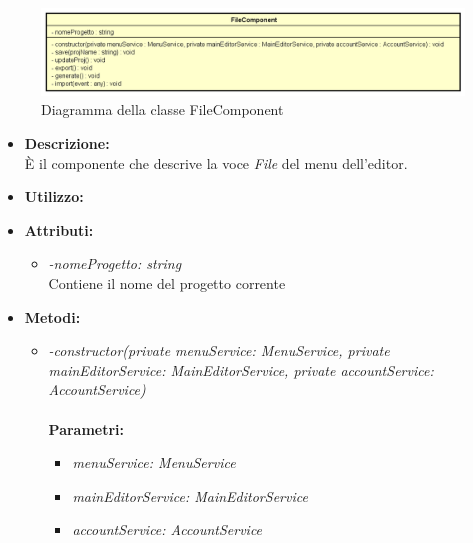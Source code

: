 \begin{figure}[h!]
	\centering
	\includegraphics[scale=0.8]{res/sections/SpecificaFrontEnd/Components/Disegnetti/file.png}
	\caption{Diagramma della classe FileComponent}
\end{figure}

\begin{itemize}
	\item \textbf{Descrizione:}\\
	È il componente che descrive la voce \textit{File} del menu dell'editor.
	\item \textbf{Utilizzo:}\\
	
	\item \textbf{Attributi:}
		\begin{itemize}
			\item \emph{-nomeProgetto: string}\\
			Contiene il nome del progetto corrente
		\end{itemize}
	\item \textbf{Metodi:}
		\begin{itemize}
			\item \emph{-constructor(private menuService: MenuService,
    private mainEditorService: MainEditorService,
    private accountService: AccountService)}\\
    		\\
    		\textbf{Parametri:}
    		\begin{itemize}
    			\item \emph{menuService: MenuService}\\
    			
    			\item \emph{mainEditorService: MainEditorService}\\
    			
    			\item \emph{accountService: AccountService}\\
    			

\end{itemize}
\end{itemize}
\end{itemize}
